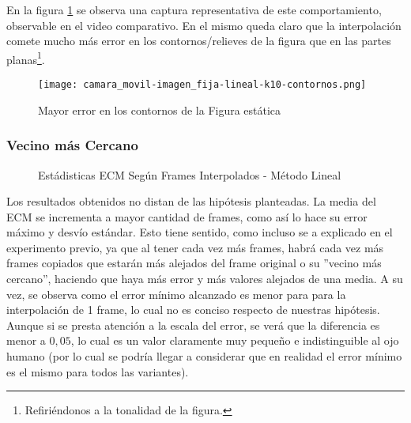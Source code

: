 \par En la figura \ref{fig:movil-fija_lineal-heatmap-contornos} se observa una
captura representativa de este comportamiento, observable en el video
comparativo. En el mismo queda claro que la interpolaci\'on comete mucho m\'as
error en los contornos/relieves de la figura que en las partes
planas\footnote{Refiri\'endonos a la tonalidad de la figura.}.

\begin{figure}[H]
    \centering
    \texttt{[image: camara\_movil-imagen\_fija-lineal-k10-contornos.png]}
    \label{fig:movil-fija_lineal-heatmap-contornos}
    \caption{Mayor error en los contornos de la Figura est\'atica}
\end{figure}

\subsubsection{Vecino m\'as Cercano}\label{subsubsec:movil-fija_vecino}

\begin{figure}[H]
    \centering
    \caption{Est\'adisticas ECM Seg\'un Frames Interpolados - M\'etodo Lineal}
    \label{fig:movil-fija_vecino-mse_estadisticas}
\end{figure}

\par Los resultados obtenidos no distan de las hip\'otesis planteadas. La media
del ECM se incrementa a mayor cantidad de frames, como as\'i lo hace su error
m\'aximo y desv\'io est\'andar. Esto tiene sentido, como incluso se a explicado
en el experimento previo, ya que al tener cada vez m\'as frames, habr\'a cada
vez m\'as frames copiados que estar\'an m\'as alejados del frame original o su
''vecino m\'as cercano'', haciendo que haya m\'as error y m\'as valores alejados
de una media. A su vez, se observa como el error m\'inimo alcanzado es menor
para para la interpolaci\'on de 1 frame, lo cual no es conciso respecto de
nuestras hip\'otesis. Aunque si se presta atenci\'on a la escala del error, se
ver\'a que la diferencia es menor a $0,05$, lo cual es un valor claramente muy
peque\~no e indistinguible al ojo humano (por lo cual se podr\'ia llegar a
considerar que en realidad el error m\'inimo es el mismo para todos las
variantes).

